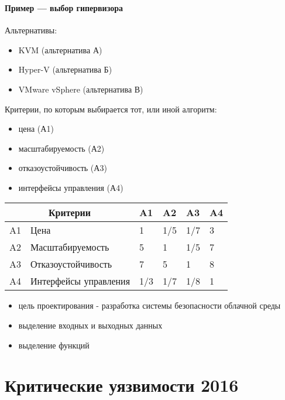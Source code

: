 \begin{frame}
\frametitle{\insertsection}
\framesubtitle{Пример --- выбор гипервизора}
Альтернативы:
\begin{itemize}
    \item KVM (альтернатива А)
    \item Hyper-V (альтернатива Б)
    \item VMware vSphere (альтернатива В)
\end{itemize}

Критерии, по которым выбирается тот, или иной алгоритм:
\begin{itemize}
    \item цена (А1)
    \item масштабируемость (А2)
    \item отказоустойчивость (А3)
    \item интерфейсы управления (А4)
\end{itemize}

\begin{table}[H]
    \begin{tabular}{|l|l|l|l|l|l|}
      \hline \multicolumn{2}{|c|}{Критерии} & A1 & A2 & A3 & A4 \\
      \hline A1 & Цена & 1 & 1/5 & 1/7 & 3 \\
      \hline A2 & Масштабируемость & 5 & 1 & 1/5 & 7 \\
      \hline A3 & Отказоустойчивость & 7 & 5 & 1 & 8 \\
      \hline A4 & Интерфейсы управления & 1/3 & 1/7 & 1/8 & 1 \\
      \hline
    \end{tabular}
\end{table}

\begin{itemize}
    \item цель проектирования - разработка системы безопасности облачной среды
    \item выделение входных и выходных данных
    \item выделение функций
\end{itemize}
\end{frame}


\section{Критические уязвимости 2016}

